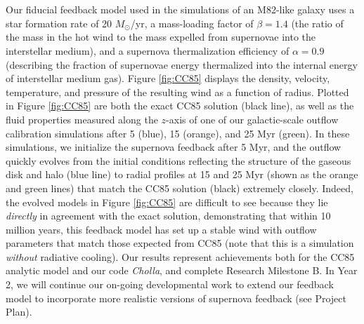 \documentclass[11pt,letterpaper,english]{article}
\begin{document}
~\\~\\
Our fiducial feedback model used in the simulations of an M82-like galaxy uses a star formation rate of 
20 $M_\odot$/yr, a mass-loading factor of $\beta = 1.4$ (the ratio of the mass in the hot wind to the
mass expelled from supernovae into the interstellar medium), and a supernova thermalization efficiency of 
$\alpha = 0.9$ (describing the fraction of supernovae energy thermalized into the internal energy of interstellar medium gas). Figure \ref{fig:CC85} displays the density, velocity, temperature, and pressure of the resulting wind as a function of radius. Plotted in Figure \ref{fig:CC85} are both the exact CC85 solution (black line), as well as the fluid properties measured along the $z$-axis of one of our galactic-scale outflow calibration simulations after 5 (blue), 15 (orange), and 25 Myr (green). In these simulations, we initialize the supernova feedback after 5 Myr, and the outflow quickly evolves from the initial conditions reflecting the structure of the gaseous disk and halo (blue line) to radial profiles
at 15 and 25 Myr (shown as the orange and green lines) that match the CC85 solution (black) extremely
closely. Indeed, the evolved models in Figure \ref{fig:CC85} are difficult to see because they lie \textit{directly} in agreement with the exact solution, demonstrating that within 10 million years, this feedback model has set up a stable wind with outflow parameters that match those expected from CC85 (note that this is a simulation \textit{without} radiative cooling). Our results represent achievements both for the CC85 analytic model and our code \textit{Cholla}, and complete Research Milestone B.
In Year 2, we will continue our on-going developmental work to extend our feedback model to incorporate more realistic versions of supernova feedback (see Project Plan).
\end{document}
